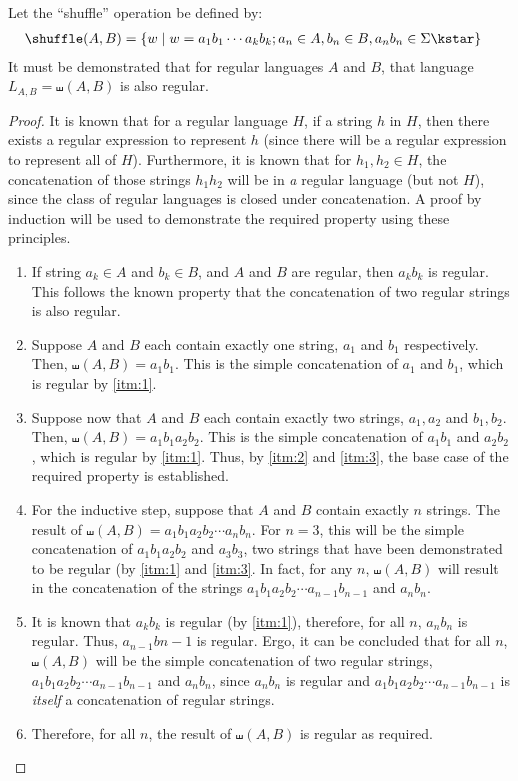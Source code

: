 Let the ``shuffle'' operation be defined by:
\begin{align*}
\shuffle(A,B) & = \{ w \mid w = a_1b_1 \cdots a_kb_k; a_n \in A, b_n \in B, a_nb_n \in \Sigma\kstar \}
\end{align*} It must be demonstrated that for regular languages $A$ and $B$, that language $L_{A,B} = \shuffle(A,B)$ is also regular.

\begin{proof}
It is known that for a regular language $H$, if a string $h$ in $H$, then there exists a regular expression to represent $h$ (since there will be a regular expression to represent all of $H$). Furthermore, it is known that for $h_1, h_2 \in H$, the concatenation of those strings $h_1h_2$ will be in \emph{a} regular language (but not $H$), since the class of regular languages is closed under concatenation. A proof by induction will be used to demonstrate the required property using these principles.
	\begin{enumerate}[label=\Roman*.]
		\item \label{itm:1} If string $a_k \in A$ and $b_k \in B$, and $A$ and $B$ are regular, then $a_kb_k$ is regular. This follows the known property that the concatenation of two regular strings is also regular.
		\item \label{itm:2} Suppose $A$ and $B$ each contain exactly one string, $a_1$ and $b_1$ respectively. Then, $\shuffle(A,B) = a_1b_1$. This is the simple concatenation of $a_1$ and $b_1$, which is regular by \ref{itm:1}. 
		\item \label{itm:3} Suppose now that $A$ and $B$ each contain exactly two strings, $a_1, a_2$ and $b_1, b_2$. Then, $ \shuffle(A,B) = a_1b_1a_2b_2$. This is the simple concatenation of $a_1b_1$ and $a_2b_2$, which is regular by \ref{itm:1}. Thus, by \ref{itm:2} and \ref{itm:3}, the base case of the required property is established.
		\item \label{itm:4} For the inductive step, suppose that $A$ and $B$ contain exactly $n$ strings. The result of $\shuffle(A,B) = a_1b_1a_2b_2 \cdots a_nb_n$. For $n=3$, this will be the simple concatenation of $a_1b_1a_2b_2$ and $a_3b_3$, two strings that have been demonstrated to be regular (by \ref{itm:1} and \ref{itm:3}. In fact, for any $n$, $\shuffle(A,B)$ will result in the concatenation of the strings $a_1b_1a_2b_2 \cdots a_{n-1}b_{n-1}$ and $a_nb_n$.
		\item It is known that $a_kb_k$ is regular (by \ref{itm:1}), therefore, for all $n$, $a_nb_n$ is regular. Thus, $a_{n-1}b{n-1}$ is regular. Ergo, it can be concluded that for all $n$, $\shuffle(A,B)$ will be the simple concatenation of two regular strings, $a_1b_1a_2b_2 \cdots a_{n-1}b_{n-1}$ and $a_nb_n$, since $a_nb_n$ is regular and $a_1b_1a_2b_2 \cdots a_{n-1}b_{n-1}$ is \emph{itself} a concatenation of regular strings.
		\item Therefore, for all $n$, the result of $\shuffle(A,B)$ is regular as required.
	\end{enumerate}
\end{proof}